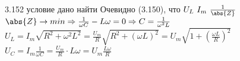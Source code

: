 \testCom
{%
	3.152
}
{%
	условие
}
{%
	дано
}
{%
	найти
}
{%
	Очевидно (3.150), что $U _L ~ I_m ~ \frac{1}{\abs{Z}}$\\
	$\abs{Z} \rightarrow min \Rightarrow \frac{1}{\omega C} - L \omega = 0 \Rightarrow C = \frac{1}{\omega^2 L}$\\
	$U_L = I_m \sqrt{R^2 + \omega^2 L^2} = \frac{U_m}{R} \sqrt{R^2 + (\omega L)^2}= U_m  \sqrt{1 + (\frac{\omega L}{R})^2}$\\
	$U_C = I_m \frac{1}{\omega C} = \frac{U_m}{R} \cdot L \omega = U_m \frac{L \omega}{R}$\\
}

